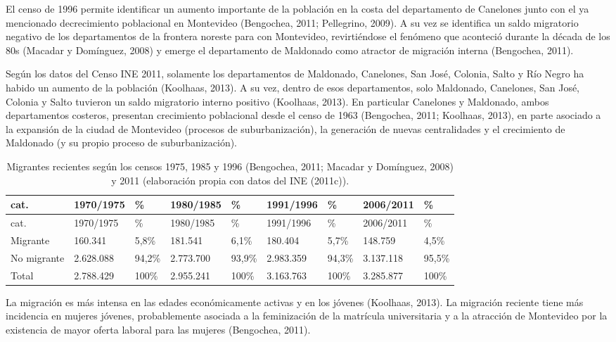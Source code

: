 \documentclass[12pt,spanish,]{article}
\begin{document}
El censo de 1996 permite identificar un aumento importante de la
población en la costa del departamento de Canelones junto con el ya
mencionado decrecimiento poblacional en Montevideo (Bengochea, 2011;
Pellegrino, 2009). A su vez se identifica un saldo migratorio negativo
de los departamentos de la frontera noreste para con Montevideo,
revirtiéndose el fenómeno que aconteció durante la década de los 80s
(Macadar y Domínguez, 2008) y emerge el departamento de Maldonado como
atractor de migración interna (Bengochea, 2011).

Según los datos del Censo INE 2011, solamente los departamentos de
Maldonado, Canelones, San José, Colonia, Salto y Río Negro ha habido un
aumento de la población (Koolhaas, 2013). A su vez, dentro de esos
departamentos, solo Maldonado, Canelones, San José, Colonia y Salto
tuvieron un saldo migratorio interno positivo (Koolhaas, 2013). En
particular Canelones y Maldonado, ambos departamentos costeros,
presentan crecimiento poblacional desde el censo de 1963 (Bengochea,
2011; Koolhaas, 2013), en parte asociado a la expansión de la ciudad de
Montevideo (procesos de suburbanización), la generación de nuevas
centralidades y el crecimiento de Maldonado (y su propio proceso de
suburbanización).

\hypertarget{tbl:mig_recientes}{}
\begin{longtable}[]{@{}lllllllll@{}}
\caption{\label{tbl:mig_recientes}Migrantes recientes según los censos
1975, 1985 y 1996 (Bengochea, 2011; Macadar y Domínguez, 2008) y 2011
(elaboración propia con datos del INE (2011c)).}\tabularnewline
\toprule
cat. & 1970/1975 & \% & 1980/1985 & \% & 1991/1996 & \% & 2006/2011 &
\%\tabularnewline
\midrule
\endfirsthead
\toprule
cat. & 1970/1975 & \% & 1980/1985 & \% & 1991/1996 & \% & 2006/2011 &
\%\tabularnewline
\midrule
\endhead
Migrante & 160.341 & 5,8\% & 181.541 & 6,1\% & 180.404 & 5,7\% & 148.759
& 4,5\%\tabularnewline
No migrante & 2.628.088 & 94,2\% & 2.773.700 & 93,9\% & 2.983.359 &
94,3\% & 3.137.118 & 95,5\%\tabularnewline
Total & 2.788.429 & 100\% & 2.955.241 & 100\% & 3.163.763 & 100\% &
3.285.877 & 100\%\tabularnewline
\bottomrule
\end{longtable}

La migración es más intensa en las edades económicamente activas y en
los jóvenes (Koolhaas, 2013). La migración reciente tiene más incidencia
en mujeres jóvenes, probablemente asociada a la feminización de la
matrícula universitaria y a la atracción de Montevideo por la existencia
de mayor oferta laboral para las mujeres (Bengochea, 2011).
\end{document}
